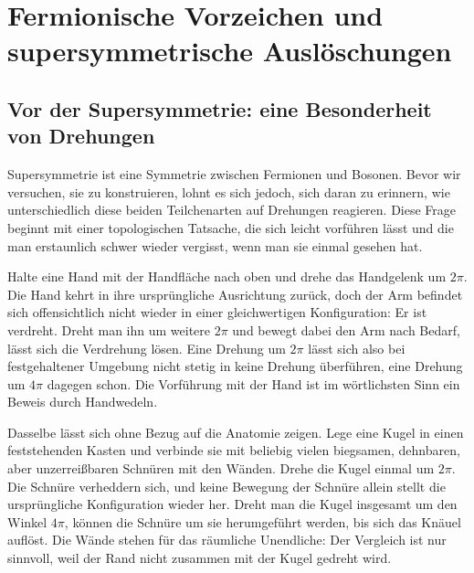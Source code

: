 \chapter{Fermionische Vorzeichen und supersymmetrische Auslöschungen}


\section{Vor der Supersymmetrie: eine Besonderheit von Drehungen}

Supersymmetrie ist eine Symmetrie zwischen Fermionen und Bosonen. Bevor wir versuchen, sie zu konstruieren, lohnt es sich jedoch, sich daran zu erinnern, wie unterschiedlich diese beiden Teilchenarten auf Drehungen reagieren. Diese Frage beginnt mit einer topologischen Tatsache, die sich leicht vorführen lässt und die man erstaunlich schwer wieder vergisst, wenn man sie einmal gesehen hat.

Halte eine Hand mit der Handfläche nach oben und drehe das Handgelenk um \(2\pi\). Die Hand kehrt in ihre ursprüngliche Ausrichtung zurück, doch der Arm befindet sich offensichtlich nicht wieder in einer gleichwertigen Konfiguration: Er ist verdreht. Dreht man ihn um weitere \(2\pi\) und bewegt dabei den Arm nach Bedarf, lässt sich die Verdrehung lösen. Eine Drehung um \(2\pi\) lässt sich also bei festgehaltener Umgebung nicht stetig in keine Drehung überführen, eine Drehung um \(4\pi\) dagegen schon. Die Vorführung mit der Hand ist im wörtlichsten Sinn ein Beweis durch Handwedeln.

Dasselbe lässt sich ohne Bezug auf die Anatomie zeigen. Lege eine Kugel in einen feststehenden Kasten und verbinde sie mit beliebig vielen biegsamen, dehnbaren, aber unzerreißbaren Schnüren mit den Wänden. Drehe die Kugel einmal um \(2\pi\). Die Schnüre verheddern sich, und keine Bewegung der Schnüre allein stellt die ursprüngliche Konfiguration wieder her. Dreht man die Kugel insgesamt um den Winkel \(4\pi\), können die Schnüre um sie herumgeführt werden, bis sich das Knäuel auflöst. Die Wände stehen für das räumliche Unendliche: Der Vergleich ist nur sinnvoll, weil der Rand nicht zusammen mit der Kugel gedreht wird.

